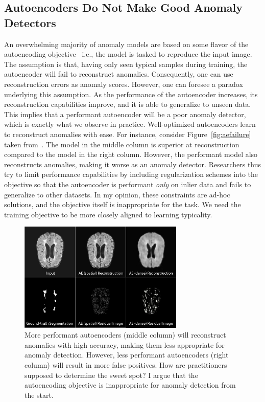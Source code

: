 \subsection*{Autoencoders Do Not Make Good Anomaly Detectors}
An overwhelming majority of anomaly models are based on some flavor of the autoencoding objective~\cite{baur_deep_2019,baur2021,tschuchnig_anomaly_2022,kascenas2023} i.e., the model is tasked to reproduce the input image. The assumption is that, having only seen typical samples during training, the autoencoder will fail to reconstruct anomalies. Consequently, one can use reconstruction errors as anomaly scores. However, one can foresee a paradox underlying this assumption. As the performance of the autoencoder increases, its reconstruction capabilities improve, and it is able to generalize to unseen data. This implies that a performant autoencoder will be a poor anomaly detector, which is exactly what we observe in practice. Well-optimized autoencoders learn to reconstruct anomalies with ease. For instance, consider Figure~\ref{fig:aefailure} taken from~\cite{baur_deep_2019}. The model in the middle column is superior at reconstruction compared to the model in the right column. However, the performant model also reconstructs anomalies, making it worse as an anomaly detector.
Researchers thus try to limit performance capabilities by including regularization schemes into the objective so that the autoencoder is performant \textit{only} on inlier data and fails to generalize to other datasets. In my opinion, these constraints are ad-hoc solutions, and the objective itself is inappropriate for the task.  We need the training objective to be more closely aligned to learning typicality. 

\begin{figure}[tbhp]
\label{fig:aefailure}
\centering
    \centering
    \includegraphics[width=0.7\textwidth]{figures/dense_vs_spatial.png}
    \caption{More performant autoencoders (middle column) will reconstruct anomalies with high accuracy, making them less appropriate for anomaly detection. However, less performant autoencoders (right column) will result in more false positives. How are practitioners supposed to determine the sweet spot? I argue that the autoencoding objective is inappropriate for anomaly detection from the start.}
    \label{fig:ae_failure}
\end{figure}%


